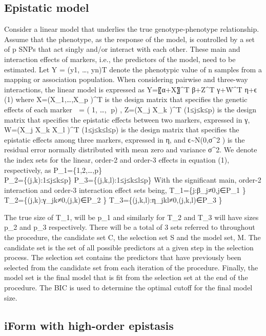 \documentclass[]{book}
\theoremstyle{definition}
\theoremstyle{definition}
\theoremstyle{remark}
\begin{document}
\subsection{Epistatic model}\label{epistatic-model}

Consider a linear model that underlies the true genotype-phenotype
relationship. Assume that the phenotype, as the response of the model,
is controlled by a set of p SNPs that act singly and/or interact with
each other. These main and interaction effects of markers, i.e., the
predictors of the model, need to be estimated. Let Y = (y1, \ldots{},
yn)T denote the phenotypic value of n samples from a mapping or
association population. When considering pairwise and three-way
interactions, the linear model is expressed as Y=〖α+X〗\^{}T β+Z\^{}T
γ+W\^{}T η+ϵ (1) where X=(X\_1,\ldots{},X\_p )\^{}T is the design matrix
that specifies the genetic effects of each marker  = (1, \ldots{}, p)
, Z=(X\_j X\_k )\^{}T (1≤j≤k≤p) is the design matrix that specifies the
epistatic effects between two markers, expressed in γ, W=(X\_j X\_k X\_l
)\^{}T (1≤j≤k≤l≤p) is the design matrix that specifies the epistatic
effects among three markers, expressed in η, and
ϵ\textasciitilde{}N(0,σ\^{}2 ) is the residual error normally
distributed with mean zero and variance σ\^{}2. We denote the index sets
for the linear, order-2 and order-3 effects in equation (1),
respectively, as P\_1=\{1,2,\ldots{},p\}\\
P\_2=\{(j,k):1≤j≤k≤p\} P\_3=\{(j,k,l):1≤j≤k≤l≤p\} With the significant
main, order-2 interaction and order-3 interaction effect sets being,
T\_1=\{j:β\_j≠0,j∈P\_1 \} T\_2=\{(j,k):γ\_jk≠0,(j,k)∈P\_2 \}
T\_3=\{(j,k,l):η\_jkl≠0,(j,k,l)∈P\_3 \}

The true size of T\_1, will be p\_1 and similarly for T\_2 and T\_3 will
have sizes p\_2 and p\_3 respectively. There will be a total of 3 sets
referred to throughout the procedure, the candidate set C, the selection
set S and the model set, M. The candidate set is the set of all possible
predictors at a given step in the selection process. The selection set
contains the predictors that have previously been selected from the
candidate set from each iteration of the procedure. Finally, the model
set is the final model that is fit from the selection set at the end of
the procedure. The BIC is used to determine the optimal cutoff for the
final model size.

\subsection{iForm with high-order
epistasis}\label{iform-with-high-order-epistasis}
\end{document}
